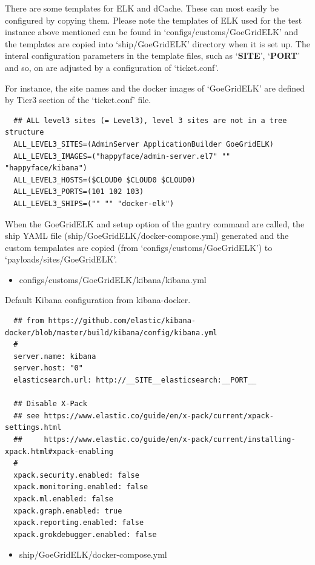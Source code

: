 \documentclass[]{article}
\begin{document}
There are some templates for ELK and dCache. These can most easily be
configured by copying them. Please note the templates of ELK used for
the test instance above mentioned can be found in
`configs/customs/GoeGridELK' and the templates are copied into
`ship/GoeGridELK' directory when it is set up. The interal configuration
parameters in the template files, such as `\textbf{SITE}',
`\textbf{PORT}' and so, on are adjusted by a configuration of
`ticket.conf'.

For instance, the site names and the docker images of `GoeGridELK' are
defined by Tier3 section of the `ticket.conf' file.

\begin{verbatim}
  ## ALL level3 sites (= Level3), level 3 sites are not in a tree structure
  ALL_LEVEL3_SITES=(AdminServer ApplicationBuilder GoeGridELK)
  ALL_LEVEL3_IMAGES=("happyface/admin-server.el7" "" "happyface/kibana")
  ALL_LEVEL3_HOSTS=($CLOUD0 $CLOUD0 $CLOUD0)
  ALL_LEVEL3_PORTS=(101 102 103)
  ALL_LEVEL3_SHIPS=("" "" "docker-elk")
\end{verbatim}

When the GoeGridELK and setup option of the gantry command are called,
the ship YAML file (ship/GoeGridELK/docker-compose.yml) generated and
the custom tempalates are copied (from `configs/customs/GoeGridELK') to
`payloads/sites/GoeGridELK'.

\begin{itemize}
\itemsep1pt\parskip0pt
\item
  configs/customs/GoeGridELK/kibana/kibana.yml
\end{itemize}

Default Kibana configuration from kibana-docker.

\begin{verbatim}
  ## from https://github.com/elastic/kibana-docker/blob/master/build/kibana/config/kibana.yml
  #
  server.name: kibana
  server.host: "0"
  elasticsearch.url: http://__SITE__elasticsearch:__PORT__
  
  ## Disable X-Pack
  ## see https://www.elastic.co/guide/en/x-pack/current/xpack-settings.html
  ##     https://www.elastic.co/guide/en/x-pack/current/installing-xpack.html#xpack-enabling
  #
  xpack.security.enabled: false
  xpack.monitoring.enabled: false
  xpack.ml.enabled: false
  xpack.graph.enabled: true
  xpack.reporting.enabled: false
  xpack.grokdebugger.enabled: false
\end{verbatim}

\begin{itemize}
\itemsep1pt\parskip0pt
\item
  ship/GoeGridELK/docker-compose.yml
\end{itemize}
\end{document}
